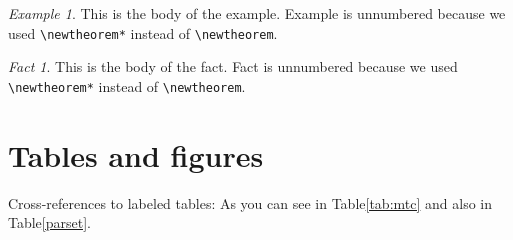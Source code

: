 \documentclass[aoas]{imsart}
\numberwithin{equation}{section}
\theoremstyle{plain}
\theoremstyle{remark}
\newtheorem*{example}{Example}
\newtheorem*{fact}{Fact}
\begin{document}
\begin{example}
This is the body of the example. Example is unnumbered because we used
\verb|\newtheorem*| instead of \verb|\newtheorem|.

\end{example}

\begin{fact}
This is the body of the fact. Fact is unnumbered because we used
\verb|\newtheorem*| instead of \verb|\newtheorem|.

\end{fact}

\hypertarget{tables-and-figures}{%
\section{Tables and figures}\label{tables-and-figures}}

Cross-references to labeled tables: As you can see in Table\ref{tab:mtc}
and also in Table\ref{parset}.
\end{document}
